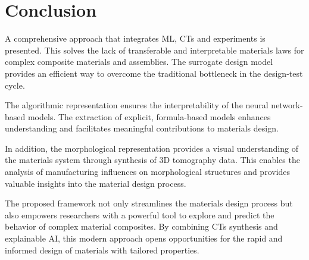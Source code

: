\section{Conclusion}
\label{Conclusion}


A comprehensive approach that integrates ML, CTs and experiments is presented. This solves the lack of transferable and interpretable materials laws for complex composite materials and assemblies. The surrogate design model provides an efficient way to overcome the traditional bottleneck in the design-test cycle. 

The algorithmic representation ensures the interpretability of the neural network-based models. The extraction of explicit, formula-based models enhances understanding and facilitates meaningful contributions to materials design. 

In addition, the morphological representation provides a visual understanding of the materials system through synthesis of 3D tomography data. This enables the analysis of manufacturing influences on morphological structures and provides valuable insights into the material design process.

The proposed framework not only streamlines the materials design process but also empowers researchers with a powerful tool to explore and predict the behavior of complex material composites. By combining CTs synthesis and explainable AI, this modern approach opens opportunities for the rapid and informed design of materials with tailored properties.